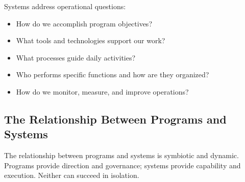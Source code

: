 \documentclass[11pt,letterpaper]{article}
\begin{document}
Systems address operational questions:

\begin{itemize}[leftmargin=2em]
    \item How do we accomplish program objectives?
    \item What tools and technologies support our work?
    \item What processes guide daily activities?
    \item Who performs specific functions and how are they organized?
    \item How do we monitor, measure, and improve operations?
\end{itemize}

\subsection{The Relationship Between Programs and Systems}

The relationship between programs and systems is symbiotic and dynamic. Programs provide direction and governance; systems provide capability and execution. Neither can succeed in isolation.
\end{document}
